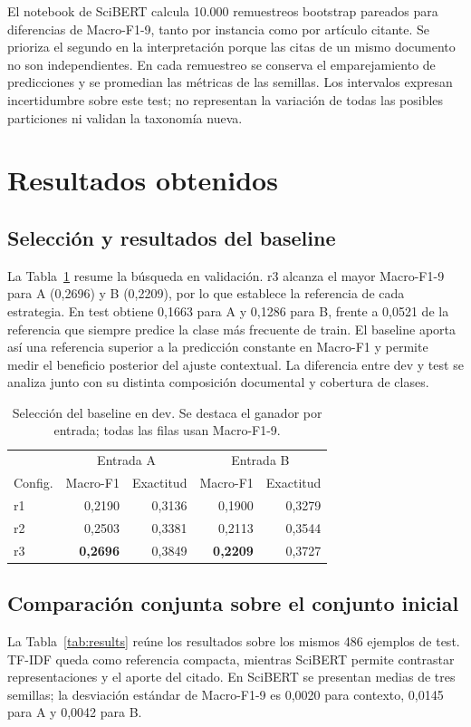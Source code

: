 \documentclass[10pt,a4paper,twocolumn]{article}
\begin{document}
El notebook de SciBERT calcula 10.000 remuestreos bootstrap pareados para diferencias de Macro-F1-9, tanto por instancia como por artículo citante. Se prioriza el segundo en la interpretación porque las citas de un mismo documento no son independientes. En cada remuestreo se conserva el emparejamiento de predicciones y se promedian las métricas de las semillas. Los intervalos expresan incertidumbre sobre este test; no representan la variación de todas las posibles particiones ni validan la taxonomía nueva.

\section{Resultados obtenidos}
\subsection{Selección y resultados del baseline}
La Tabla~\ref{tab:tfdev} resume la búsqueda en validación. r3 alcanza el mayor Macro-F1-9 para A (0,2696) y B (0,2209), por lo que establece la referencia de cada estrategia. En test obtiene 0,1663 para A y 0,1286 para B, frente a 0,0521 de la referencia que siempre predice la clase más frecuente de train. El baseline aporta así una referencia superior a la predicción constante en Macro-F1 y permite medir el beneficio posterior del ajuste contextual. La diferencia entre dev y test se analiza junto con su distinta composición documental y cobertura de clases.

\begin{table}[t]
\centering\small
\caption{Selección del baseline en dev. Se destaca el ganador por entrada; todas las filas usan Macro-F1-9.}\label{tab:tfdev}
\begin{tabular}{lrrrr}\toprule
 & \multicolumn{2}{c}{Entrada A} & \multicolumn{2}{c}{Entrada B}\\
Config. & Macro-F1 & Exactitud & Macro-F1 & Exactitud\\\midrule
r1 & 0,2190 & 0,3136 & 0,1900 & 0,3279\\
r2 & 0,2503 & 0,3381 & 0,2113 & 0,3544\\
r3 & \textbf{0,2696} & 0,3849 & \textbf{0,2209} & 0,3727\\\bottomrule
\end{tabular}
\end{table}


\subsection{Comparación conjunta sobre el conjunto inicial}
La Tabla~\ref{tab:results} reúne los resultados sobre los mismos 486 ejemplos de test. TF-IDF queda como referencia compacta, mientras SciBERT permite contrastar representaciones y el aporte del citado. En SciBERT se presentan medias de tres semillas; la desviación estándar de Macro-F1-9 es 0,0020 para contexto, 0,0145 para A y 0,0042 para B.
\end{document}
